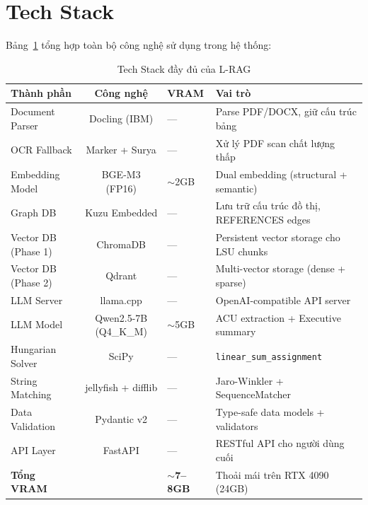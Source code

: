 \section{Tech Stack}

Bảng~\ref{tab:tech_stack_full} tổng hợp toàn bộ công nghệ sử dụng trong hệ thống:

\begin{table}[H]
    \centering
    \caption{Tech Stack đầy đủ của L-RAG}
    \label{tab:tech_stack_full}
    \begin{tabularx}{\textwidth}{X c X X}
        \toprule
        \textbf{Thành phần} & \textbf{Công nghệ} & \textbf{VRAM} & \textbf{Vai trò}\\
        \midrule
        Document Parser & Docling (IBM) & — & Parse PDF/DOCX, giữ cấu trúc bảng\\
        OCR Fallback & Marker + Surya & — & Xử lý PDF scan chất lượng thấp\\
        Embedding Model & BGE-M3 (FP16) & $\sim$2GB & Dual embedding (structural + semantic)\\
        Graph DB & Kuzu Embedded & — & Lưu trữ cấu trúc đồ thị, REFERENCES edges\\
        Vector DB (Phase 1) & ChromaDB & — & Persistent vector storage cho LSU chunks\\
        Vector DB (Phase 2) & Qdrant & — & Multi-vector storage (dense + sparse)\\
        LLM Server & llama.cpp & — & OpenAI-compatible API server\\
        LLM Model & Qwen2.5-7B (Q4\_K\_M) & $\sim$5GB & ACU extraction + Executive summary\\
        Hungarian Solver & SciPy & — & \texttt{linear\_sum\_assignment}\\
        String Matching & jellyfish + difflib & — & Jaro-Winkler + SequenceMatcher\\
        Data Validation & Pydantic v2 & — & Type-safe data models + validators\\
        API Layer & FastAPI & — & RESTful API cho người dùng cuối\\
        \midrule
        \textbf{Tổng VRAM} & & \textbf{$\sim$7--8GB} & Thoải mái trên RTX 4090 (24GB)\\
        \bottomrule
    \end{tabularx}
\end{table}

